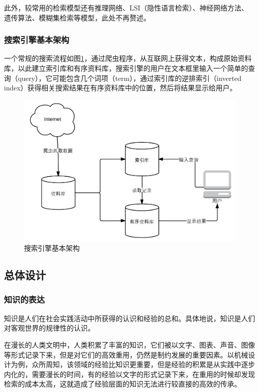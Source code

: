 \documentclass[12pt,a4paper]{article}
\begin{document}
	此外，较常用的检索模型还有推理网络、LSI（隐性语言检索）、神经网络方法、遗传算法、模糊集检索等模型，此处不再赘述。
		
		\subsubsection{搜索引擎基本架构}
	一个常规的搜索流程如图\ref{fig:basicStructure}，通过爬虫程序，从互联网上获得文本，构成原始资料库，以此建立索引库和有序资料库，搜索引擎的用户在文本框里输入一个简单的查询（query），它可能包含几个词项（term），通过索引库的逆排索引（inverted index）获得相关搜索结果在有序资料库中的位置，然后将结果显示给用户。
		
	\begin{figure}[htbp] 
	\centering\includegraphics[width=5in]{fig/basicStructure.png} 
	\caption{搜索引擎基本架构}\label{fig:basicStructure} 
	\end{figure} 
		
	\subsection{总体设计}
		\subsubsection{知识的表达}
	知识是人们在社会实践活动中所获得的认识和经验的总和。具体地说，知识是人们对客观世界的规律性的认识。\cite{Chen2010}
	
	在漫长的人类文明中，人类积累了丰富的知识，它们被以文字、图表、声音、图像等形式记录下来，但是对它们的高效重用，仍然是制约发展的重要因素。以机械设计为例，众所周知，该领域的经验比知识更重要，但是经验的积累是从实践中逐步内化的，需要漫长的时间，有的经验以文字的形式记录下来，在重用的时候却发现检索的成本太高，这就造成了经验层面的知识无法进行较直接的高效的传承。
	
\end{document}
